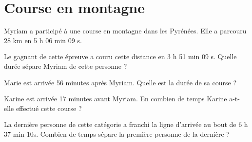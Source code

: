 \section{Course en montagne}

Myriam a participé à une course en montagne dans les Pyrénées.
Elle a parcouru 28 km en 5 h 06 min 09 s.

\begin{questions}
	\question Le gagnant de cette épreuve a couru cette distance en 3 h 51 min 09 s. Quelle durée sépare Myriam de cette personne ?
	
	\question Marie est arrivée 56 minutes après Myriam. Quelle est la durée de sa course ?
	
	\question Karine est arrivée 17 minutes avant Myriam. En combien de temps Karine a-t-elle effectué cette course ?
	
	\question La dernière personne de cette catégorie a franchi la ligne d'arrivée au bout de 6 h 37 min 10s. Combien de temps sépare la première personne de la dernière ?
\end{questions}